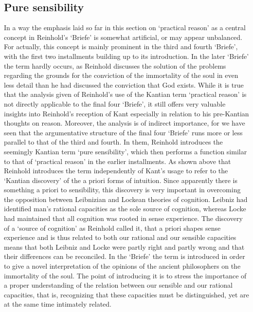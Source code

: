 \subsection{Pure sensibility}


In a way the emphasis laid so far in this section on `practical reason' as a central concept in Reinhold's `Briefe' is somewhat artificial, or may appear unbalanced. For actually, this concept is mainly prominent in the third and fourth `Briefe', with the first two installments building up to its introduction. In the later `Briefe' the term hardly occurs, as Reinhold discusses the solution of the problems regarding the grounds for the conviction of the immortality of the soul in even less detail than he had discussed the conviction that God exists. While it is true that the analysis given of Reinhold's use of the Kantian term `practical reason' is not directly applicable to the final four `Briefe', it still offers very valuable insights into Reinhold's reception of Kant especially in relation to his pre{-}Kantian thoughts on reason. Moreover, the analysis is of indirect importance, for we have seen that the argumentative structure of the final four `Briefe' runs more or less parallel to that of the third and fourth. In them, Reinhold introduces the seemingly Kantian term `pure sensibility', which then performs a function similar to that of `practical reason' in the earlier installments. As shown above that Reinhold introduces the term independently of Kant's usage to refer to the `Kantian discovery' of the a priori forms of intuition. Since apparently there is something a priori to sensibility, this discovery is very important in overcoming the opposition between Leibnizian and Lockean theories of cognition. Leibniz had identified man's rational capacities as the sole source of cognition, whereas Locke had maintained that all cognition was rooted in sense experience. The discovery of a `source of cognition' as Reinhold called it, that a priori shapes sense experience and is thus related to both our rational and our sensible capacities means that both Leibniz and Locke were partly right and partly wrong and that their differences can be reconciled. In the `Briefe' the term is introduced in order to give a novel interpretation of the opinions of the ancient philosophers on the immortality of the soul. The point of introducing it is to stress the importance of a proper understanding of the relation between our sensible and our rational capacities, that is, recognizing that these capacities must be distinguished, yet are at the same time intimately related.

